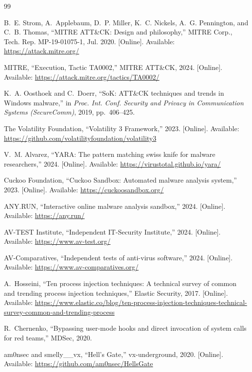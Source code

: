 \documentclass[10pt,a4paper,twocolumn]{article}
\begin{document}
\begin{thebibliography}{99}
\small\sffamily

B.~E. Strom, A.~Applebaum, D.~P. Miller, K.~C. Nickels, A.~G. Pennington, and C.~B. Thomas,
``MITRE ATT\&CK: Design and philosophy,''
MITRE Corp., Tech. Rep. MP-19-01075-1, Jul. 2020.
[Online]. Available: \url{https://attack.mitre.org/}

MITRE, ``Execution, Tactic TA0002,'' MITRE ATT\&CK, 2024.
[Online]. Available: \url{https://attack.mitre.org/tactics/TA0002/}

K.~A. Oosthoek and C.~Doerr,
``SoK: ATT\&CK techniques and trends in Windows malware,''
in \textit{Proc. Int. Conf. Security and Privacy in Communication Systems (SecureComm)}, 2019, pp.~406--425.

The Volatility Foundation,
``Volatility 3 Framework,'' 2023.
[Online]. Available: \url{https://github.com/volatilityfoundation/volatility3}

V.~M. Alvarez,
``YARA: The pattern matching swiss knife for malware researchers,'' 2024.
[Online]. Available: \url{https://virustotal.github.io/yara/}

Cuckoo Foundation,
``Cuckoo Sandbox: Automated malware analysis system,'' 2023.
[Online]. Available: \url{https://cuckoosandbox.org/}

ANY.RUN,
``Interactive online malware analysis sandbox,'' 2024.
[Online]. Available: \url{https://any.run/}

AV-TEST Institute,
``Independent IT-Security Institute,'' 2024.
[Online]. Available: \url{https://www.av-test.org/}

AV-Comparatives,
``Independent tests of anti-virus software,'' 2024.
[Online]. Available: \url{https://www.av-comparatives.org/}

A.~Hosseini,
``Ten process injection techniques: A technical survey of common and trending process injection techniques,''
Elastic Security, 2017.
[Online]. Available: \url{https://www.elastic.co/blog/ten-process-injection-techniques-technical-survey-common-and-trending-process}

R.~Chernenko,
``Bypassing user-mode hooks and direct invocation of system calls for red teams,''
MDSec, 2020.

am0nsec and smelly\_\_vx,
``Hell's Gate,''
vx-underground, 2020.
[Online]. Available: \url{https://github.com/am0nsec/HellsGate}


\end{thebibliography}
\end{document}
